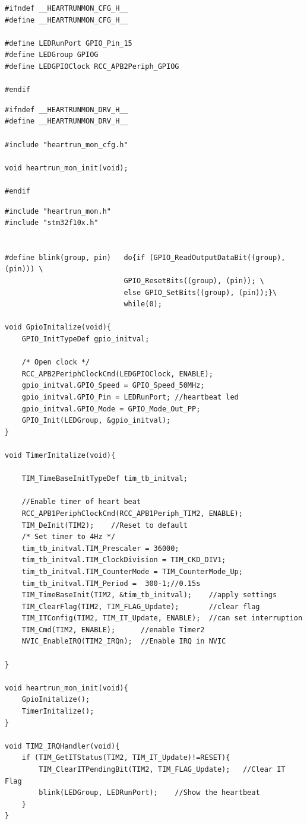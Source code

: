 \documentclass[a4paper]{ctexart}
\begin{document}
\begin{lstlisting}[caption={File heartrun\_mon\_cfg.h},label={heartmonch}]
#ifndef __HEARTRUNMON_CFG_H__
#define __HEARTRUNMON_CFG_H__

#define LEDRunPort GPIO_Pin_15
#define LEDGroup GPIOG
#define LEDGPIOClock RCC_APB2Periph_GPIOG

#endif
\end{lstlisting}

\begin{lstlisting}[caption={File heartrun\_mon.h},label={heartmondh}]
#ifndef __HEARTRUNMON_DRV_H__
#define __HEARTRUNMON_DRV_H__

#include "heartrun_mon_cfg.h"

void heartrun_mon_init(void);

#endif
\end{lstlisting}

\begin{lstlisting}[caption={File heartrun\_mon.c},label={heartmondc}]
#include "heartrun_mon.h"
#include "stm32f10x.h"


#define blink(group, pin)   do{if (GPIO_ReadOutputDataBit((group), (pin))) \
							GPIO_ResetBits((group), (pin)); \
							else GPIO_SetBits((group), (pin));}\
							while(0);

void GpioInitalize(void){
	GPIO_InitTypeDef gpio_initval;

	/* Open clock */
	RCC_APB2PeriphClockCmd(LEDGPIOClock, ENABLE);
	gpio_initval.GPIO_Speed = GPIO_Speed_50MHz;
	gpio_initval.GPIO_Pin = LEDRunPort;	//heartbeat led
	gpio_initval.GPIO_Mode = GPIO_Mode_Out_PP;
	GPIO_Init(LEDGroup, &gpio_initval);
}

void TimerInitalize(void){

	TIM_TimeBaseInitTypeDef tim_tb_initval;

	//Enable timer of heart beat
	RCC_APB1PeriphClockCmd(RCC_APB1Periph_TIM2, ENABLE);  
	TIM_DeInit(TIM2);	 //Reset to default
	/* Set timer to 4Hz */
	tim_tb_initval.TIM_Prescaler = 36000; 
	tim_tb_initval.TIM_ClockDivision = TIM_CKD_DIV1;	
	tim_tb_initval.TIM_CounterMode = TIM_CounterMode_Up;	
	tim_tb_initval.TIM_Period =  300-1;//0.15s	  	
	TIM_TimeBaseInit(TIM2, &tim_tb_initval);	//apply settings
	TIM_ClearFlag(TIM2, TIM_FLAG_Update);		//clear flag
	TIM_ITConfig(TIM2, TIM_IT_Update, ENABLE);	//can set interruption
	TIM_Cmd(TIM2, ENABLE);		//enable Timer2
	NVIC_EnableIRQ(TIM2_IRQn);	//Enable IRQ in NVIC

}

void heartrun_mon_init(void){
	GpioInitalize();
	TimerInitalize();
}

void TIM2_IRQHandler(void){
	if (TIM_GetITStatus(TIM2, TIM_IT_Update)!=RESET){
		TIM_ClearITPendingBit(TIM2, TIM_FLAG_Update);	//Clear IT Flag
		blink(LEDGroup, LEDRunPort);	//Show the heartbeat
	}
}
\end{lstlisting}
\end{document}
